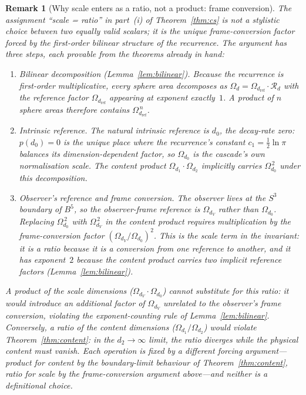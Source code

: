 \documentclass[11pt,a4paper]{article}
\newtheorem{remark}[theorem]{Remark}
\begin{document}
\begin{remark}[Why scale enters as a ratio, not a product: frame conversion]\label{rem:sp7-status}
The assignment ``scale = ratio'' in part~(i) of Theorem~\ref{thm:cs} is
not a stylistic choice between two equally valid scalars; it is the
unique frame-conversion factor forced by the first-order bilinear
structure of the recurrence. The argument has three steps, each
provable from the theorems already in hand:
\begin{enumerate}
\item[(1)] \emph{Bilinear decomposition
(Lemma~\ref{lem:bilinear}).} Because the recurrence is first-order
multiplicative, every sphere area decomposes as
$\Omega_d = \Omega_{d_{\mathrm{ref}}}\cdot\mathcal{R}_d$ with the
reference factor $\Omega_{d_{\mathrm{ref}}}$ appearing at exponent
exactly~$1$. A product of $n$ sphere areas therefore contains
$\Omega_{d_{\mathrm{ref}}}^{\,n}$.
\item[(2)] \emph{Intrinsic reference.} The natural intrinsic reference
is $d_0$, the decay-rate zero: $p(d_0) = 0$ is the unique place where
the recurrence's constant $c_1 = \tfrac{1}{2}\ln\pi$ balances its
dimension-dependent factor, so $\Omega_{d_0}$ is the cascade's own
normalisation scale. The content product
$\Omega_{d_1}\cdot\Omega_{d_2}$ implicitly carries
$\Omega_{d_0}^{\,2}$ under this decomposition.
\item[(3)] \emph{Observer's reference and frame conversion.} The
observer lives at the $S^3$ boundary of $B^5$, so the observer-frame
reference is $\Omega_{d_V}$ rather than $\Omega_{d_0}$. Replacing
$\Omega_{d_0}^{\,2}$ with $\Omega_{d_V}^{\,2}$ in the content product
requires multiplication by the frame-conversion factor
$(\Omega_{d_V}/\Omega_{d_0})^{2}$. This is the scale term in the
invariant: it is a \emph{ratio} because it is a conversion from one
reference to another, and it has exponent~$2$ because the content
product carries two implicit reference factors
(Lemma~\ref{lem:bilinear}).
\end{enumerate}
A product of the scale dimensions ($\Omega_{d_V}\cdot\Omega_{d_0}$)
cannot substitute for this ratio: it would introduce an additional
factor of $\Omega_{d_V}$ unrelated to the observer's frame conversion,
violating the exponent-counting rule of
Lemma~\ref{lem:bilinear}. Conversely, a ratio of the content
dimensions ($\Omega_{d_1}/\Omega_{d_2}$) would violate
Theorem~\ref{thm:content}: in the $d_2\to\infty$ limit, the ratio
diverges while the physical content must vanish. Each operation is
fixed by a different forcing argument---product for content by the
boundary-limit behaviour of Theorem~\ref{thm:content}, ratio for
scale by the frame-conversion argument above---and neither is a
definitional choice.
\end{remark}
\end{document}
